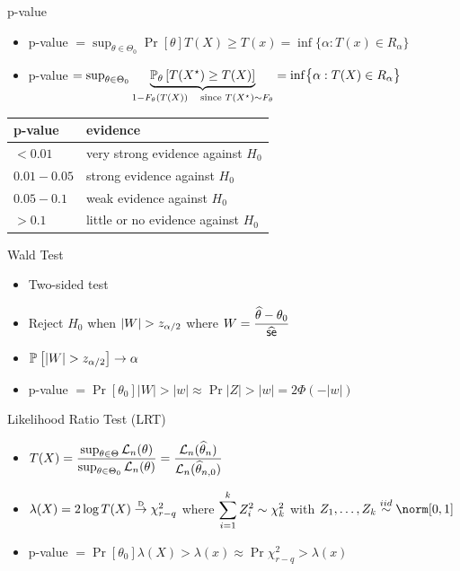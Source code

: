 \documentclass[landscape]{article}
\begin{document}
\begin{multicols*}{2}
\raggedright
p-value
\begin{itemize}
  \item p-value $= \sup_{\theta\in\Theta_0} \Pr[\theta]{T(X) \ge T(x)}
                 = \inf\bigl\{ \alpha: T(x) \in R_\alpha \bigr\}$
  \item p-value $= \sup_{\theta\in\Theta_0} 
    \underbrace{\Pr[\theta]{T(X^\star) \ge T(X)}}_{1-F_\theta(T(X)) 
          \quad \text{since } T(X^\star) \dist F_\theta}
                 = \inf\bigl\{ \alpha: T(X) \in R_\alpha \bigr\}$
\end{itemize}

\centering
\begin{tabular}{ll}
  \textsf{p-value} & \textsf{evidence} \\
  \hline
  $< 0.01$      & very strong evidence against $H_0$ \\
  $0.01 - 0.05$ & strong evidence against $H_0$ \\
  $0.05 - 0.1$  & weak evidence against $H_0$ \\
  $> 0.1$       & little or no evidence against $H_0$ \\
\end{tabular}

\raggedright
Wald Test
\begin{itemize}
  \item Two-sided test
  \item Reject $H_0$ when $|W| > \zat$ where 
    $W = \displaystyle\frac{\that - \theta_0}{\sehat}$
  \item $\Pr{|W| > \zat} \conv \alpha$
  \item p-value $= \Pr[\theta_0]{|W| > |w|} 
                 \approx \Pr{|Z| > |w|}
                 = 2\Phi(-|w|)$
\end{itemize}

Likelihood Ratio Test (LRT)
\begin{itemize}
 \item $T(X) = \displaystyle\frac{\sup_{\theta\in\Theta}\Lln(\theta)}%
                                 {\sup_{\theta\in\Theta_0}\Lln(\theta)}
             = \frac{\Lln(\that_n)}{\Lln(\that_{n,0})}$
 \item $\lambda(X) = 2\log T(X) \dconv \chi_{r-q}^2$ 
  where $\displaystyle\sum_{i=1}^k Z_i^2 \dist \chi_k^2$ with 
    $Z_1,\dots,Z_k \distiid \norm[0,1]$
  \item p-value $= \Pr[\theta_0]{\lambda(X) > \lambda(x)} 
                 \approx \Pr{\chi_{r-q}^2 > \lambda(x)}$
\end{itemize}


\end{multicols*}
\end{document}
